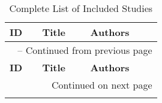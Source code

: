
\sloppy

\begin{landscape}
    \footnotesize
    \begin{longtable}{|p{0.5cm}|p{9cm}|p{7cm}|}
    \caption{Complete List of Included Studies}\label{tab:all_papers_compact}\\
    \hline
    \textbf{ID} & \textbf{Title} & \textbf{Authors} \\
    \hline
    \endfirsthead

    \multicolumn{3}{c}{\tablename\ \thetable{} -- Continued from previous page} \\
    \hline
    \textbf{ID} & \textbf{Title} & \textbf{Authors} \\
    \hline
    \endhead

    \hline
    \multicolumn{3}{r}{Continued on next page} \\
    \endfoot

    \hline
    \endlastfoot


\end{longtable}
\end{landscape}
